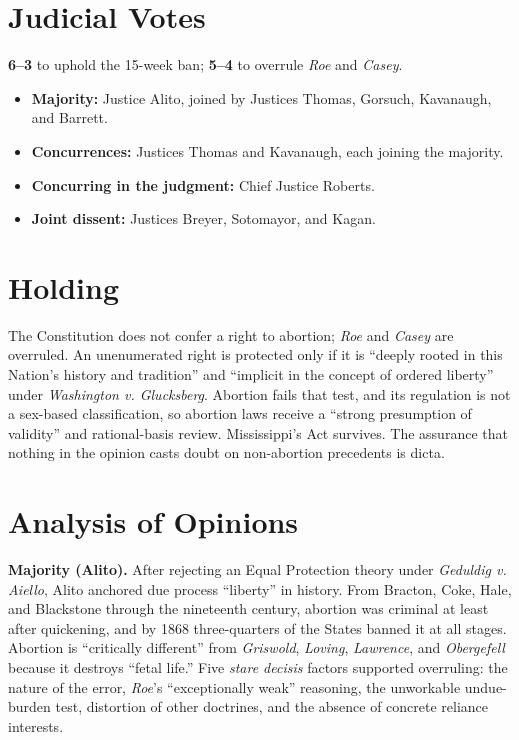 \documentclass[12pt]{article}
\begin{document}
\section{Judicial Votes}

\textbf{6--3} to uphold the 15-week ban; \textbf{5--4} to overrule \textit{Roe} and \textit{Casey}.
\begin{itemize}
\item \textbf{Majority:} Justice Alito, joined by Justices Thomas, Gorsuch, Kavanaugh, and Barrett.
\item \textbf{Concurrences:} Justices Thomas and Kavanaugh, each joining the majority.
\item \textbf{Concurring in the judgment:} Chief Justice Roberts.
\item \textbf{Joint dissent:} Justices Breyer, Sotomayor, and Kagan.
\end{itemize}

\section{Holding}

The Constitution does not confer a right to abortion; \textit{Roe} and \textit{Casey} are overruled. An unenumerated right is protected only if it is ``deeply rooted in this Nation's history and tradition'' and ``implicit in the concept of ordered liberty'' under \textit{Washington v. Glucksberg}. Abortion fails that test, and its regulation is not a sex-based classification, so abortion laws receive a ``strong presumption of validity'' and rational-basis review. Mississippi's Act survives. The assurance that nothing in the opinion casts doubt on non-abortion precedents is dicta.

\section{Analysis of Opinions}

\textbf{Majority (Alito).} After rejecting an Equal Protection theory under \textit{Geduldig v. Aiello}, Alito anchored due process ``liberty'' in history. From Bracton, Coke, Hale, and Blackstone through the nineteenth century, abortion was criminal at least after quickening, and by 1868 three-quarters of the States banned it at all stages. Abortion is ``critically different'' from \textit{Griswold}, \textit{Loving}, \textit{Lawrence}, and \textit{Obergefell} because it destroys ``fetal life.'' Five \textit{stare decisis} factors supported overruling: the nature of the error, \textit{Roe}'s ``exceptionally weak'' reasoning, the unworkable undue-burden test, distortion of other doctrines, and the absence of concrete reliance interests.
\end{document}
